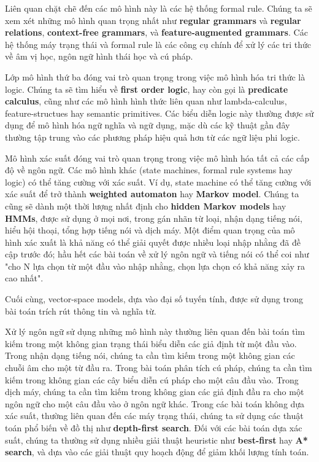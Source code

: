 Liên quan chặt chẽ đến các mô hình này là các hệ thống formal rule. Chúng ta sẽ xem xét những mô hình quan trọng nhất như \textbf{regular grammars} và \textbf{regular relations}, \textbf{context-free grammars}, và \textbf{feature-augmented grammars}. Các hệ thống máy trạng thái và formal rule là các công cụ chính để xử lý các tri thức về âm vị học, ngôn ngữ hình thái học và cú pháp.

Lớp mô hình thứ ba đóng vai trò quan trọng trong việc mô hình hóa tri thức là logic. Chúng ta sẽ tìm hiểu về \textbf{first order logic}, hay còn gọi là \textbf{predicate calculus}, cũng như các mô hình hình thức liên quan như lambda-calculus, feature-structues hay semantic primitives. Các biểu diễn logic này thường được sử dụng để mô hình hóa ngữ nghĩa và ngữ dụng, mặc dù các kỹ thuật gần đây thường tập trung vào các phương pháp hiệu quả hơn từ các ngữ liệu phi logic.

Mô hình xác suất đóng vai trò quan trọng trong việc mô hình hóa tất cả các cấp độ về ngôn ngữ. Các mô hình khác (state machines, formal rule systems hay logic) có thể tăng cường với xác suất. Ví dụ, state machine có thể tăng cường với xác suất để trở thành \textbf{weighted automaton} hay \textbf{Markov model}. Chúng ta cũng sẽ dành một thời lượng nhất định cho \textbf{hidden Markov models} hay \textbf{HMMs}, được sử dụng ở mọi nơi, trong gán nhãn từ loại, nhận dạng tiếng nói, hiểu hội thoại, tổng hợp tiếng nói và dịch máy. Một điểm quan trọng của mô hình xác xuất là khả năng có thể giải quyết được nhiều loại nhập nhằng đã đề cập trước đó; hầu hết các bài toán về xử lý ngôn ngữ và tiếng nói có thể coi như "cho N lựa chọn từ một đầu vào nhập nhằng, chọn lựa chọn có khả năng xảy ra cao nhất".

Cuối cùng, vector-space models, dựa vào đại số tuyến tính, được sử dụng trong bài toán trích rút thông tin và nghĩa từ.

Xử lý ngôn ngữ sử dụng những mô hình này thường liên quan đến bài toán tìm kiếm trong một không gian trạng thái biểu diễn các giả định từ một đầu vào. Trong nhận dạng tiếng nói, chúng ta cần tìm kiếm trong một không gian các chuỗi âm cho một từ đầu ra. Trong bài toán phân tích cú pháp, chúng ta cần tìm kiếm trong không gian các cây biểu diễn cú pháp cho một câu đầu vào. Trong dịch máy, chúng ta cần tìm kiếm trong không gian các giả định đầu ra cho một ngôn ngữ cho một câu đầu vào ở ngôn ngữ khác. Trong các bài toán không dựa xác suất, thường liên quan đến các máy trạng thái, chúng ta sử dụng các thuật toán phổ biến về đồ thị như \textbf{depth-first search}. Đối với các bài toán dựa xác suất, chúng ta thường sử dụng nhiều giải thuật heuristic như \textbf{best-first} hay \textbf{A* search}, và dựa vào các giải thuật quy hoạch động để giảm khối lượng tính toán.


